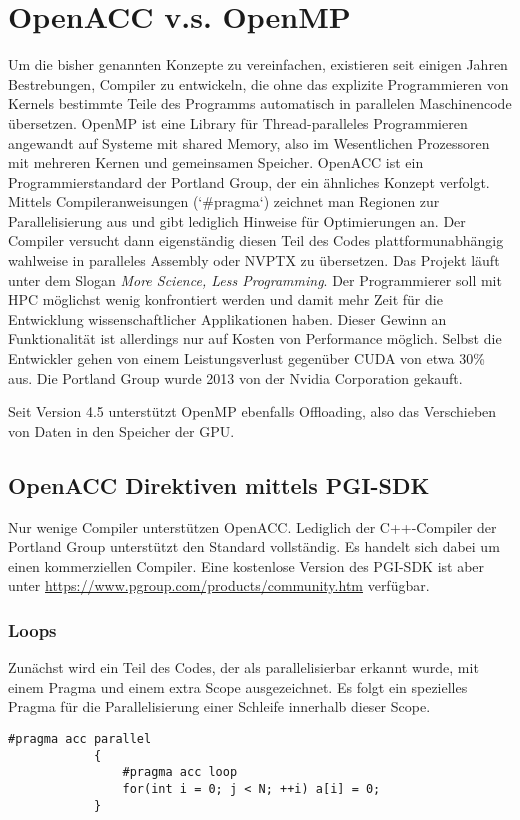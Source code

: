 	\chapter{OpenACC v.s. OpenMP}
	Um die bisher genannten Konzepte zu vereinfachen, existieren seit einigen Jahren Bestrebungen, Compiler zu entwickeln, die ohne das explizite Programmieren von \Glspl{Kernel} bestimmte Teile des Programms automatisch in parallelen Maschinencode übersetzen. OpenMP ist eine Library für Thread-paralleles Programmieren angewandt auf Systeme mit shared Memory, also im Wesentlichen Prozessoren mit mehreren Kernen und gemeinsamen Speicher. OpenACC ist ein Programmierstandard der Portland Group, der ein ähnliches Konzept verfolgt. Mittels Compileranweisungen (\li`#pragma`) zeichnet man Regionen zur Parallelisierung aus und gibt lediglich Hinweise für Optimierungen an. Der Compiler versucht dann eigenständig diesen Teil des Codes plattformunabhängig wahlweise in paralleles Assembly oder \Gls{NVPTX} zu übersetzen. Das Projekt läuft unter dem Slogan \textit{More Science, Less Programming}. Der Programmierer soll mit HPC möglichst wenig konfrontiert werden und damit mehr Zeit für die Entwicklung wissenschaftlicher Applikationen haben. Dieser Gewinn an Funktionalität ist allerdings nur auf Kosten von Performance möglich. Selbst die Entwickler gehen von einem Leistungsverlust gegenüber CUDA von etwa 30\% aus. Die Portland Group wurde 2013 von der Nvidia Corporation gekauft.
	
	Seit Version 4.5 unterstützt OpenMP ebenfalls Offloading, also das Verschieben von Daten in den Speicher der GPU.
	 
		\section{OpenACC Direktiven mittels PGI-SDK}
		Nur wenige Compiler unterstützen OpenACC. Lediglich der C++-Compiler der Portland Group unterstützt den Standard vollständig. Es handelt sich dabei um einen kommerziellen Compiler. Eine kostenlose Version des PGI-SDK ist aber unter \url{https://www.pgroup.com/products/community.htm} verfügbar.
		
			\subsection{Loops}
			Zunächst wird ein Teil des Codes, der als parallelisierbar erkannt wurde, mit einem Pragma und einem extra Scope ausgezeichnet. Es folgt ein spezielles Pragma für die Parallelisierung einer Schleife innerhalb dieser Scope. 
			\begin{lstlisting}[caption=OpenACC: Loops]
			#pragma acc parallel
			{
				#pragma acc loop
				for(int i = 0; j < N; ++i) a[i] = 0;
			}
			\end{lstlisting}
			

